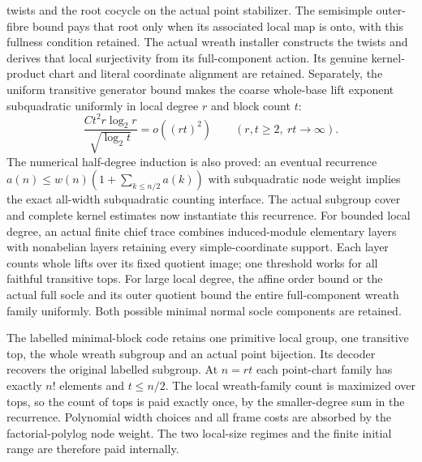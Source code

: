 twists and the root cocycle on the actual point stabilizer. The
semisimple outer-fibre bound pays that root only when its associated
local map is onto, with this fullness condition retained. The
actual wreath installer constructs the twists and derives that local
surjectivity from its full-component action. Its genuine kernel-product
chart and literal coordinate alignment are retained. Separately, the
uniform transitive generator bound makes the coarse whole-base lift
exponent subquadratic uniformly in local degree $r$ and block count $t$:
\[
 \frac{Ct^2r\log_2 r}{\sqrt{\log_2 t}}=o((rt)^2)
 \qquad(r,t\ge2,\ rt\longrightarrow\infty).
\]
The numerical half-degree induction is also proved: an eventual
recurrence $a(n)\le w(n)(1+\sum_{k\le n/2}a(k))$ with subquadratic
node weight implies the exact all-width subquadratic counting interface.
The actual subgroup cover and complete kernel estimates now instantiate
this recurrence. For bounded local degree, an actual finite chief trace
combines induced-module elementary layers with nonabelian layers retaining
every simple-coordinate support. Each layer counts whole lifts over its
fixed quotient image; one threshold works for all faithful transitive
tops. For large local degree, the affine order bound or the actual full
socle and its outer quotient bound the entire full-component wreath
family uniformly. Both possible minimal normal socle components are
retained.

The labelled minimal-block code retains one primitive local group, one
transitive top, the whole wreath subgroup and an actual point bijection.
Its decoder recovers the original labelled subgroup. At $n=rt$ each
point-chart family has exactly $n!$ elements and $t\le n/2$. The local
wreath-family count is maximized over tops, so the count of tops is paid
exactly once, by the smaller-degree sum in the recurrence. Polynomial
width choices and all frame costs are absorbed by the factorial-polylog
node weight. The two local-size regimes and the finite initial range
are therefore paid internally.

